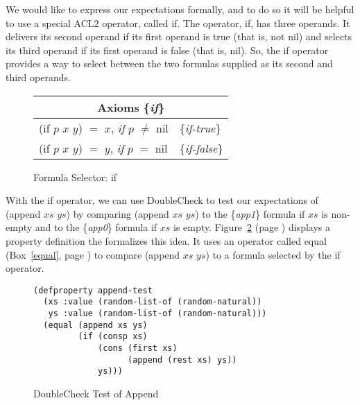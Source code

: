 We would like to express our expectations formally,
and to do so it will be helpful to use a special ACL2 operator,
called \textsf{if}.
The operator, \textsf{if}, has three operands.
It delivers its second operand if
its first operand is true (that is, not \textsf{nil})
and selects its third operand
if its first operand is false (that is, \textsf{nil}).
So, the \textsf{if} operator provides a way to select between
the two formulas supplied as its second and third operands.

\begin{figure}
\begin{tabular}{ll}
\multicolumn{2}{c}{Axioms \{\emph{if}\}} \\
\hline
\textsf{(if $p$ $x$ $y$}) $=$ $x$, \emph{if} $p$ $\neq$ \textsf{nil}  & \{\emph{if-true}\}  \\
\textsf{(if $p$ $x$ $y$)} $=$ $y$, \emph{if} $p$ $=$ \textsf{nil}     & \{\emph{if-false}\} \\
\end{tabular}
\caption{Formula Selector: \textsf{if}}
\label{fig:if-axioms}
\end{figure}

With the \textsf{if} operator, we can use DoubleCheck
to test our expectations of \textsf{(append $xs$ $ys$)}
by comparing \textsf{(append $xs$ $ys$)} to the \{\emph{app1}\} formula
if $xs$ is non-empty and to the \{\emph{app0}\} formula if $xs$ is empty.
Figure~\ref{fig:append-test} (page \pageref{fig:append-test})
displays a property definition the formalizes this idea.
It uses an operator called
\textsf{equal} (Box~\ref{equal}, page \pageref{equal})
to compare \textsf{(append $xs$ $ys$)}
to a formula selected by the \textsf{if} operator.

\begin{figure}
\begin{code}
\begin{verbatim}
(defproperty append-test
  (xs :value (random-list-of (random-natural))
   ys :value (random-list-of (random-natural)))
  (equal (append xs ys)
         (if (consp xs)
             (cons (first xs)
                   (append (rest xs) ys))
             ys)))
\end{verbatim}
\end{code}
\caption{DoubleCheck Test of Append}
\label{fig:append-test}
\end{figure}

